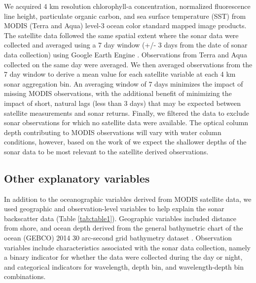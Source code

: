 \documentclass[10pt,letterpaper]{article}
\begin{document}
We acquired 4 km resolution chlorophyll-a concentration, normalized fluorescence line height, particulate organic carbon, and sea surface temperature (SST) from MODIS (Terra and Aqua) level-3 ocean color standard mapped image products. The satellite data followed the same spatial extent where the sonar data were collected and averaged using a 7 day window (+/- 3 days from the date of sonar data collection) using Google Earth Engine \cite{nasa2014moderate}. Observations from Terra and Aqua collected on the same day were averaged. We then averaged observations from the 7 day window to derive a mean value for each satellite variable at each 4 km sonar aggregation bin. An averaging window of 7 days minimizes the impact of missing MODIS observations, with the additional benefit of minimizing the impact of short, natural lags (less than 3 days) that may be expected between satellite measurements and sonar returns. Finally, we filtered the data to exclude sonar observations for which no satellite data were available. The optical column depth contributing to MODIS observations will vary with water column conditions, however, based on the work of \cite{lee2007euphotic} we expect the shallower depths of the sonar data to be most relevant to the satellite derived observations.

\subsection*{Other explanatory variables}

In addition to the oceanographic variables derived from MODIS satellite data, we used geographic and observation-level variables to help explain the sonar backscatter data (Table \ref{tab:table1}). Geographic variables included distance from shore, and ocean depth derived from the general bathymetric chart of the ocean (GEBCO) 2014 30 arc-second grid bathymetry dataset \cite{gebco}. Observation variables include characteristics associated with the sonar data collection, namely a binary indicator for whether the data were collected during the day or night, and categorical indicators for wavelength, depth bin, and wavelength-depth bin combinations.
\end{document}

